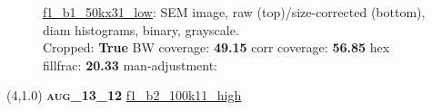 \begin{figure}[h!]
\label{semimg9}
\caption*{\hyperlink{covtableaug_13_12}{\color{blue} \small \ttfamily f1\_b1\_50kx31\_low}: SEM image, raw (top)/size-corrected (bottom), diam histograms, binary, grayscale.\\Cropped: {\bf True} \;\; BW coverage: {\bf 49.15} \:\: corr coverage: {\bf 56.85} \:\: hex fillfrac: {\bf 20.33} \:\: man-adjustment: {\bf \color{blue}{Yes}}}
\end{figure}
\newpage

\begin{textblock}{5}(4,1.0)
{\bf \textsc{aug\_13\_12}}
\hspace{4.5cm}
\hyperlink{covtableaug_13_12}{\color{blue} \large \ttfamily f1\_b2\_100k11\_high}
\end{textblock}

